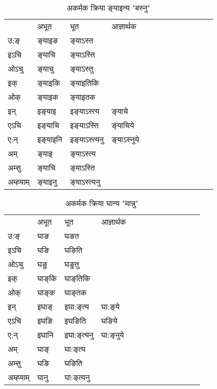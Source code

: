 \begin{table}[H]
\label{ɛn.vi} \centering
\caption{अकर्मक क्रिया  ङ्‌याइन्य  "बस्नु"  }
\begin{tabular}{l|l|l|l|l|l|l|l|l|l|l|l|l}  \toprule
&अभूत & भूत & आज्ञार्थक \\ 
उ:ङ्‌ &ङ्‌याइङ &ङ्‌याऽस्त \\ 
इऽचि &ङ्‌याचि &ङ्‌याऽस्ति   \\ 
ओऽचु &ङ्‌याचु &ङ्‌याऽस्तु   \\ 
इक् &ङ्‌याइकि &ङ्‌याइतिकि   \\ 
ओक् &ङ्‌याइक &ङ्‌याइतक   \\ 
इन् & इङ्‌याइ & इङ्‌याऽस्त्य &ङ्‌याचे  \\ 
एऽचि & इङ्‌याचि & इङ्‌याऽस्ति &ङ्‌याचिये    \\ 
ए:न् & इङ्‌याइनि  & इङ्‌याऽस्त्यनु &ङ्‌याऽस्‍नुये  \\ 
अम् & ङ्‌याइ & ङ्‌याऽस्त्य   \\ 
अम्सु & ङ्‌याचि & ङ्‌याऽस्ति   \\ 
अम्ह्‍याम् & ङ्‌याइनु  & ङ्‌याऽस्त्यनु \\ 
\bottomrule
\end{tabular}
\end{table}


\begin{table}[H]
\label{aŋ.vi} \centering
\caption{अकर्मक क्रिया  घान्य  "मान्नु"  }
\begin{tabular}{l|l|l|l|l|l|l|l|l|l|l|l|l}  \toprule
&अभूत & भूत & आज्ञार्थक \\ 
उ:ङ्‌ &घाङ &घङत \\ 
इऽचि &घङि &घङिति   \\ 
ओऽचु &घङु &घङुतु   \\ 
इक् &घाङ्‌कि &घाङ्‌तिकि   \\ 
ओक् &घाङ्‌क &घाङ्‌तक   \\ 
इन् & इघाङ्‌ & इघा:ङ्‌त्य &घा:ङ्‌ये  \\ 
एऽचि & इघङि & इघङिति &घङिये    \\ 
ए:न् & इघानि  & इघा:ङ्‌त्यनु &घा:ङ्‌नुये  \\ 
अम् & घाङ्‌ & घा:ङ्‌त्य   \\ 
अम्सु & घङि & घङिति   \\ 
अम्ह्‍याम् & घानु  & घा:ङ्‌त्यनु \\ 
\bottomrule
\end{tabular}
\end{table}


